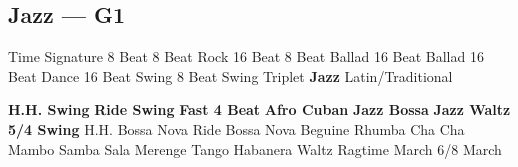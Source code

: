 \subsection{Jazz --- \UiKey{\II}\UiKey{\MET}G1}
Time Signature
8 Beat
8 Beat Rock
16 Beat
8 Beat Ballad
16 Beat Ballad
16 Beat Dance
16 Beat Swing
8 Beat Swing
Triplet
\textbf{Jazz}
Latin/Traditional





























\textbf{H.H. Swing}
\textbf{Ride Swing}
\textbf{Fast 4 Beat}
\textbf{Afro Cuban}
\textbf{Jazz Bossa}
\textbf{Jazz Waltz}
\textbf{5/4 Swing}
H.H. Bossa Nova
Ride Bossa Nova
Beguine
Rhumba
Cha Cha
Mambo
Samba
Sala
Merenge
Tango
Habanera
Waltz
Ragtime
March
6/8 March
